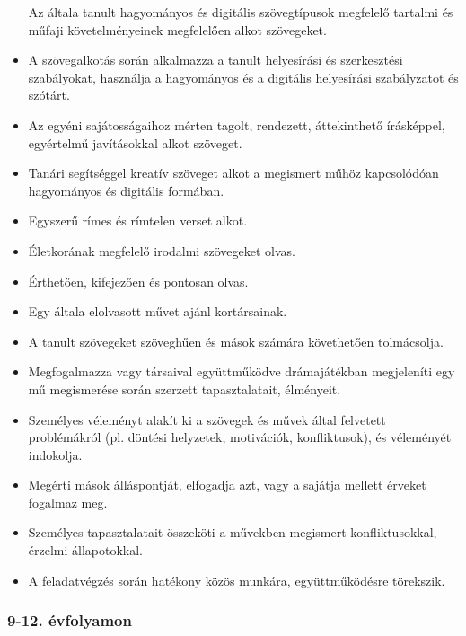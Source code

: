\begin{itemize}
  Az általa tanult hagyományos és digitális szövegtípusok megfelelő
  tartalmi és műfaji követelményeinek megfelelően alkot szövegeket.
\item
  A szövegalkotás során alkalmazza a tanult helyesírási és szerkesztési
  szabályokat, használja a hagyományos és a digitális helyesírási
  szabályzatot és szótárt.
\item
  Az egyéni sajátosságaihoz mérten tagolt, rendezett, áttekinthető
  írásképpel, egyértelmű javításokkal alkot szöveget.
\item
  Tanári segítséggel kreatív szöveget alkot a megismert műhöz
  kapcsolódóan hagyományos és digitális formában.
\item
  Egyszerű rímes és rímtelen verset alkot.
\item
  Életkorának megfelelő irodalmi szövegeket olvas.
\item
  Érthetően, kifejezően és pontosan olvas.
\item
  Egy általa elolvasott művet ajánl kortársainak.
\item
  A tanult szövegeket szöveghűen és mások számára követhetően
  tolmácsolja.
\item
  Megfogalmazza vagy társaival együttműködve drámajátékban megjeleníti
  egy mű megismerése során szerzett tapasztalatait, élményeit.
\item
  Személyes véleményt alakít ki a szövegek és művek által felvetett
  problémákról (pl. döntési helyzetek, motivációk, konfliktusok), és
  véleményét indokolja.
\item
  Megérti mások álláspontját, elfogadja azt, vagy a sajátja mellett
  érveket fogalmaz meg.
\item
  Személyes tapasztalatait összeköti a művekben megismert
  konfliktusokkal, érzelmi állapotokkal.
\item
  A feladatvégzés során hatékony közös munkára, együttműködésre
  törekszik.
\end{itemize}

\hypertarget{evfolyamon-23}{%
\subsubsection{9-12. évfolyamon}\label{evfolyamon-23}}

